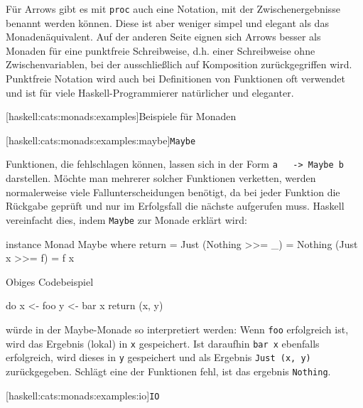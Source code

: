 \documentclass[11pt, a4paper, bibgerm]{scrbook}
\newcommand\icode[1]{\lstinline?#1?}
\newcommand\lsubsubsection{}
\newcommand\lparagraph{}
\begin{document}
Für Arrows gibt es mit \icode{proc} auch eine Notation, mit der
Zwischenergebnisse benannt werden können. Diese ist aber weniger simpel
und elegant als das Monadenäquivalent. Auf der anderen Seite eignen sich
Arrows besser als Monaden für eine punktfreie Schreibweise, d.h. einer
Schreibweise ohne Zwischenvariablen, bei der ausschließlich auf
Komposition zurückgegriffen wird. Punktfreie Notation wird auch bei
Definitionen von Funktionen oft verwendet und ist für viele
Haskell-Programmierer natürlicher und eleganter.

\lsubsubsection[haskell:cats:monads:examples]{Beispiele für Monaden}

\lparagraph[haskell:cats:monads:examples:maybe]{\icode{Maybe}}

Funktionen, die fehlschlagen können, lassen sich in der Form \icode{a
  -> Maybe b} darstellen. Möchte man mehrerer solcher Funktionen
verketten, werden normalerweise viele Fallunterscheidungen benötigt, da
bei jeder Funktion die Rückgabe geprüft und nur im Erfolgsfall die
nächste aufgerufen muss. Haskell vereinfacht dies, indem \icode{Maybe}
zur Monade erklärt wird:
\begin{code}
instance Monad Maybe
  where return = Just
        (Nothing >>= _) = Nothing
        (Just x  >>= f) = f x
\end{code} %
Obiges Codebeispiel
\begin{code}
do x <- foo
   y <- bar x
   return (x, y)
\end{code}
würde in der Maybe-Monade so interpretiert werden: Wenn \icode{foo}
erfolgreich ist, wird das Ergebnis (lokal) in \icode{x} gespeichert. Ist
daraufhin \icode{bar x} ebenfalls erfolgreich, wird dieses in \icode{y}
gespeichert und als Ergebnis \icode{Just (x, y)} zurückgegeben. Schlägt
eine der Funktionen fehl, ist das ergebnis \icode{Nothing}.

\lparagraph[haskell:cats:monads:examples:io]{\icode{IO}}
\end{document}
